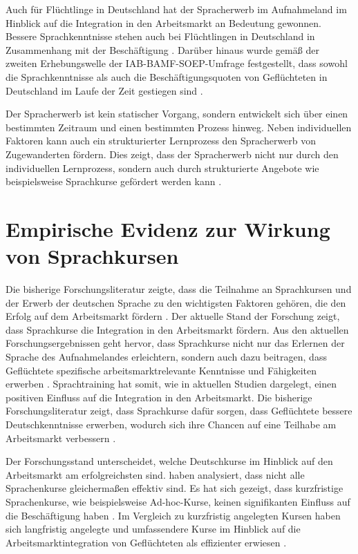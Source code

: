 Auch für Flüchtlinge in Deutschland hat der Spracherwerb im Aufnahmeland im Hinblick auf die Integration in den Arbeitsmarkt an Bedeutung gewonnen. Bessere Sprachkenntnisse stehen auch bei Flüchtlingen in Deutschland in Zusammenhang mit der Beschäftigung \parencite{kosyakova2017large}. Darüber hinaus wurde gemäß der zweiten Erhebungswelle der IAB-BAMF-SOEP-Umfrage festgestellt, dass sowohl die Sprachkenntnisse als auch die Beschäftigungsquoten von Geflüchteten in Deutschland im Laufe der Zeit gestiegen sind \parencite{brucker2019gefluchtete}.

Der Spracherwerb ist kein statischer Vorgang, sondern entwickelt sich über einen bestimmten Zeitraum und einen bestimmten Prozess hinweg. Neben individuellen Faktoren kann auch ein strukturierter Lernprozess den Spracherwerb von Zugewanderten fördern. Dies zeigt, dass der Spracherwerb nicht nur durch den individuellen Lernprozess, sondern auch durch strukturierte Angebote wie beispielsweise Sprachkurse gefördert werden kann \parencite{Kosyakova04042022}.

\section{Empirische Evidenz zur Wirkung von Sprachkursen}
\label{cha:empirische}

Die bisherige Forschungsliteratur zeigte, dass die Teilnahme an Sprachkursen und der Erwerb der deutschen Sprache zu den wichtigsten Faktoren gehören, die den Erfolg auf dem Arbeitsmarkt fördern \parencites{brucker2019language}{lang2022employment}{marbach2025does}. Der aktuelle Stand der Forschung zeigt, dass Sprachkurse die Integration in den Arbeitsmarkt fördern. Aus den aktuellen Forschungsergebnissen geht hervor, dass Sprachkurse nicht nur das Erlernen der Sprache des Aufnahmelandes erleichtern, sondern auch dazu beitragen, dass Geflüchtete spezifische arbeitsmarktrelevante Kenntnisse und Fähigkeiten erwerben \parencite{iza:izadps:dp16091}. Sprachtraining hat somit, wie in aktuellen Studien dargelegt, einen positiven Einfluss auf die Integration in den Arbeitsmarkt. Die bisherige Forschungsliteratur zeigt, dass Sprachkurse dafür sorgen, dass Geflüchtete bessere Deutschkenntnisse erwerben, wodurch sich ihre Chancen auf eine Teilhabe am Arbeitsmarkt verbessern \parencites{lang2022employment}{marbach2025does}.

Der Forschungsstand unterscheidet, welche Deutschkurse im Hinblick auf den Arbeitsmarkt am erfolgreichsten sind. \textcite{marbach2025does} haben analysiert, dass nicht alle Sprachenkurse gleichermaßen effektiv sind. Es hat sich gezeigt, dass kurzfristige Sprachenkurse, wie beispielsweise Ad-hoc-Kurse, keinen signifikanten Einfluss auf die Beschäftigung haben \parencite{marbach2025does}. Im Vergleich zu kurzfristig angelegten Kursen haben sich langfristig angelegte und umfassendere Kurse im Hinblick auf die Arbeitsmarktintegration von Geflüchteten als effizienter erwiesen \parencite{marbach2025does}. 

